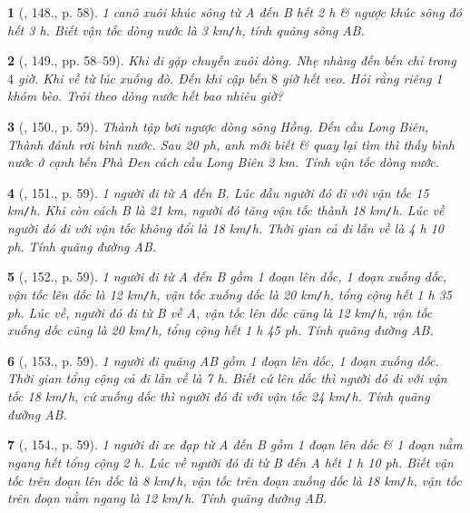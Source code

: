 \documentclass{article}
\newtheorem{baitoan}{}
\begin{document}
\begin{baitoan}[\cite{Binh_Toan_6_tap_2}, 148., p. 58]
	1 canô xuôi khúc sông từ A đến B hết {\rm2 h} \& ngược khúc sông đó hết {\rm3 h}. Biết vận tốc dòng nước là {\rm3 km{\tt/}h}, tính quãng sông AB.
\end{baitoan}

\begin{baitoan}[\cite{Binh_Toan_6_tap_2}, 149., pp. 58--59]
	Khi đi gặp chuyến xuôi dòng. Nhẹ nhàng đến bến chỉ trong $4$ giờ. Khi về từ lúc xuống đò. Đến khi cập bến $8$ giờ hết veo. Hỏi rằng riêng 1 khóm bèo. Trôi theo dòng nước hết bao nhiêu giờ?
\end{baitoan}

\begin{baitoan}[\cite{Binh_Toan_6_tap_2}, 150., p. 59]
	Thành tập bơi ngược dòng sông Hồng. Đến cầu Long Biên, Thành đánh rơi bình nước. Sau {\rm20 ph}, anh mới biết \& quay lại tìm thì thấy bình nước ở cạnh bến Phà Đen cách cầu Long Biên {\rm2 km}. Tính vận tốc dòng nước.
\end{baitoan}

\begin{baitoan}[\cite{Binh_Toan_6_tap_2}, 151., p. 59]
	1 người đi từ A đến B. Lúc đầu người đó đi với vận tốc {\rm15 km{\tt/}h}. Khi còn cách B là {\rm21 km}, người đó tăng vận tốc thành {\rm18 km{\tt/}h}. Lúc về người đó đi với vận tốc không đổi là {\rm18 km{\tt/}h}. Thời gian cả đi lẫn về là {\rm4 h 10 ph}. Tính quãng đường AB.
\end{baitoan}

\begin{baitoan}[\cite{Binh_Toan_6_tap_2}, 152., p. 59]
	1 người đi từ A đến B gồm 1 đoạn lên dốc, 1 đoạn xuống dốc, vận tốc lên dốc là {\rm12 km{\tt/}h}, vận tốc xuống dốc là {\rm20 km{\tt/}h}, tổng cộng hết {\rm1 h 35 ph}. Lúc về, người đó đi từ B về A, vận tốc lên dốc cũng là {\rm12 km{\tt/}h}, vận tốc xuống dốc cũng là {\rm20 km{\tt/}h}, tổng cộng hết {\rm1 h 45 ph}. Tính quãng đường AB.
\end{baitoan}

\begin{baitoan}[\cite{Binh_Toan_6_tap_2}, 153., p. 59]
	1 người đi quãng AB gồm 1 đoạn lên dốc, 1 đoạn xuống dốc. Thời gian tổng cộng cả đi lẫn về là {\rm7 h}. Biết cứ lên dốc thì người đó đi với vận tốc {\rm18 km{\tt/}h}, cứ xuống dốc thì người đó đi với vận tốc {\rm24 km{\tt/}h}. Tính quãng đường AB.
\end{baitoan}

\begin{baitoan}[\cite{Binh_Toan_6_tap_2}, 154., p. 59]
	1 người đi xe đạp từ A đến B gồm 1 đoạn lên dốc \& 1 đoạn nằm ngang hết tổng cộng {\rm2 h}. Lúc về người đó đi từ B đến A hết {\rm1 h 10 ph}. Biết vận tốc trên đoạn lên dốc là {\rm8 km{\tt/}h}, vận tốc trên đoạn xuống dốc là {\rm18 km{\tt/}h}, vận tốc trên đoạn nằm ngang là {\rm12 km{\tt/}h}. Tính quãng đường AB.
\end{baitoan}
\end{document}
